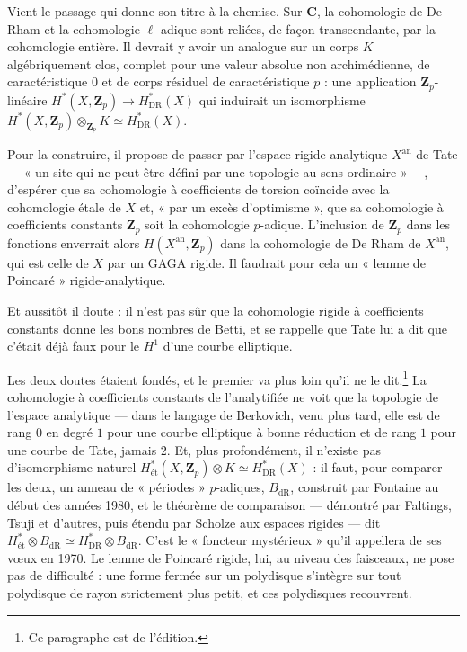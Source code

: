 \documentclass[11pt,a4paper]{article}
\begin{document}
Vient le passage qui donne son titre à la chemise. Sur $\mathbf{C}$, la
cohomologie de De Rham et la cohomologie $\ell$-adique sont reliées, de
façon transcendante, par la cohomologie entière. Il devrait y avoir un
analogue sur un corps $K$ algébriquement clos, complet pour une valeur
absolue non archimédienne, de caractéristique $0$ et de corps résiduel de
caractéristique $p$ : une application $\mathbf{Z}_p$-linéaire
$H^{*}(X, \mathbf{Z}_p) \to H^{*}_{\mathrm{DR}}(X)$ qui induirait un
isomorphisme $H^{*}(X, \mathbf{Z}_p) \otimes_{\mathbf{Z}_p} K \simeq
H^{*}_{\mathrm{DR}}(X)$.

Pour la construire, il propose de passer par l'espace rigide-analytique
$X^{\mathrm{an}}$ de Tate — « un site qui ne peut être défini par une
topologie au sens ordinaire » —, d'espérer que sa cohomologie à coefficients
de torsion coïncide avec la cohomologie étale de $X$ et, « par un excès
d'optimisme », que sa cohomologie à coefficients constants $\mathbf{Z}_p$
soit la cohomologie $p$-adique. L'inclusion de $\mathbf{Z}_p$ dans les
fonctions enverrait alors $H(X^{\mathrm{an}}, \mathbf{Z}_p)$ dans la
cohomologie de De Rham de $X^{\mathrm{an}}$, qui est celle de $X$ par un
GAGA rigide. Il faudrait pour cela un « lemme de Poincaré »
rigide-analytique.

Et aussitôt il doute : il n'est pas sûr que la cohomologie rigide à
coefficients constants donne les bons nombres de Betti, et se rappelle que
Tate lui a dit que c'était déjà faux pour le $H^{1}$ d'une courbe
elliptique.

Les deux doutes étaient fondés, et le premier va plus loin qu'il ne le
dit.\footnote{Ce paragraphe est de l'édition.} La cohomologie à
coefficients constants de l'analytifiée ne voit que la topologie de
l'espace analytique — dans le langage de Berkovich, venu plus tard, elle
est de rang $0$ en degré $1$ pour une courbe elliptique à bonne réduction
et de rang $1$ pour une courbe de Tate, jamais $2$. Et, plus profondément,
il n'existe pas d'isomorphisme naturel $H^{*}_{\text{ét}}(X,
\mathbf{Z}_p) \otimes K \simeq H^{*}_{\mathrm{DR}}(X)$ : il faut, pour
comparer les deux, un anneau de « périodes » $p$-adiques, $B_{\mathrm{dR}}$,
construit par Fontaine au début des années 1980, et le théorème de
comparaison — démontré par Faltings, Tsuji et d'autres, puis étendu par
Scholze aux espaces rigides — dit $H^{*}_{\text{ét}} \otimes
B_{\mathrm{dR}} \simeq H^{*}_{\mathrm{DR}} \otimes B_{\mathrm{dR}}$. C'est le
« foncteur mystérieux » qu'il appellera de ses vœux en 1970. Le lemme de
Poincaré rigide, lui, au niveau des faisceaux, ne pose pas de difficulté :
une forme fermée sur un polydisque s'intègre sur tout polydisque de rayon
strictement plus petit, et ces polydisques recouvrent.
\end{document}
